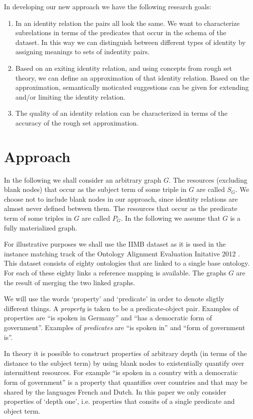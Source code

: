 \documentclass[letterpaper]{article}
\begin{document}
In developing our new approach we have the following research goals:

\begin{enumerate}
\item In an identity relation the pairs all look the same. We want to characterize subrelations in terms of the predicates that occur in the schema of the dataset. In this way we can distinguish between different types of identity by assigning meanings to sets of indentity pairs.
\item Based on an exiting identity relation, and using concepts from rough set theory, we can define an approximation of that identity relation. Based on the approximation, semantically moticated suggestions can be given for extending and/or limiting the identity relation.
\item The quality of an identity relation can be characterized in terms of the accuracy of the rough set approximation.
\end{enumerate}

\section{Approach}
\label{sec:approach}

In the following we shall consider an arbitrary graph $G$. The resources (excluding blank nodes) that occur as the subject term of some triple in $G$ are called $S_G$. We choose not to include blank nodes in our approach, since identity relations are almost never defined between them. The resources that occur as the predicate term of some triples in $G$ are called $P_G$. In the following we assume that $G$ is a fully materialized graph.

For illustrative purposes we shall use the IIMB dataset as it is used in the instance matching track of the Ontology Alignment Evaluation Initative 2012 \cite{oaei_2012}. This dataset consists of eighty ontologies that are linked to a single base ontology. For each of these eighty links a reference mapping is available. The graphs $G$ are the result of merging the two linked graphs.

We will use the words `property' and `predicate' in order to denote sligtly different things. A \emph{property} is taken to be a predicate-object pair. Examples of properties are ``is spoken in Germany'' and ``has a democratic form of government''. Examples of \emph{predicates} are ``is spoken in'' and ``form of government is''.

In theory it is possible to construct properties of arbitrary depth (in terms of the distance to the subject term) by using blank nodes to existentially quantify over intermittent resources. For example ``is spoken in a country with a democratic form of government'' is a property that quantifies over countries and that may be shared by the languages French and Dutch. In this paper we only consider properties of `depth one', i.e. properties that consits of a single predicate and object term.
\end{document}
